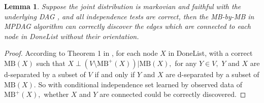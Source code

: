 \documentclass{article}
\newtheorem{lemma}{Lemma}
\begin{document}
\begin{lemma}
\label{lemma:adj}
Suppose the joint distribution is markovian and faithful with the underlying DAG , and all independence tests are correct, then the MB-by-MB in MPDAG algorithm can correctly discover the edges which are connected to each node in DoneList without their orientation.
\end{lemma}
\begin{proof}
According to Theorem 1 in \citep{wang2014discovering}, for each node $X$ in DoneList, with a correct $\mathrm{MB}(X)$ such that $X \perp (V\setminus \mathrm{MB}^+(X))|\mathrm{MB}(X),$ for any $Y\in V,$ $Y$ and $X$ are d-separated by a subset of $V$ if and only if $Y$ and $X$ are d-separated by a subset of $\mathrm{MB}(X).$ So with conditional independence set learned by observed data of $\mathrm{MB}^+(X),$ whether $X$ and $Y$ are connected could be correctly discovered.
\end{proof}
\end{document}
